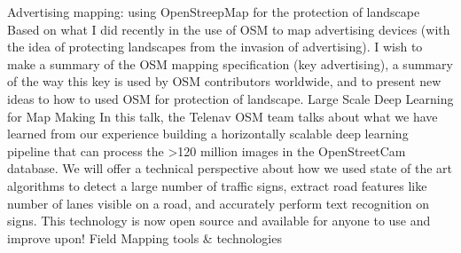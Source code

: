 %
{Advertising mapping: using OpenStreepMap for the protection of landscape }%
{}%
{%
%   
% 
  Based on what I did recently in the use of OSM to map advertising devices (with the idea of
  protecting landscapes from the invasion of advertising).  I wish to make a summary of the OSM
  mapping specification (key advertising), a summary of the way this key is used by OSM contributors
  worldwide, and to present new ideas to how to used OSM for protection of landscape.
%
}
%
{Large Scale Deep Learning for Map Making}%
{}%
{%
  In this talk, the Telenav OSM team talks about what we have learned from our experience building a
  horizontally scalable deep learning pipeline that can process the >120 million images in the
  OpenStreetCam database. We will offer a technical perspective about how we used state of the art
  algorithms to detect a large number of traffic signs, extract road features like number of lanes
  visible on a road, and accurately perform text recognition on signs. This technology is now open
  source and available for anyone to use and improve upon!%
}
%
{Field Mapping tools \& technologies}%
{}%
